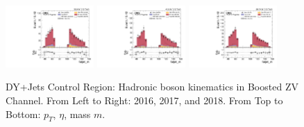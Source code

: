 \begin{figure}[!ht]
  \includegraphics[width=0.30\textwidth]{analysis_plots/2016_zv/cr_vjets_l/fatjet_m.pdf}
  \includegraphics[width=0.30\textwidth]{analysis_plots/2017_zv/cr_vjets_l/fatjet_m.pdf}
  \includegraphics[width=0.30\textwidth]{analysis_plots/2018_zv/cr_vjets_l/fatjet_m.pdf} \\
  \caption[DY+Jets Control Region: Hadronic boson kinematics in Boosted ZV Channel]%
  {DY+Jets Control Region: Hadronic boson kinematics in Boosted ZV Channel. From Left to Right: 2016,
    2017, and 2018. From Top to Bottom: \( p_T \), \( \eta \), mass \( m \).}%
  \label{fig:zv-cr-vjets-l-fatjet-pt-eta-m}
\end{figure}

